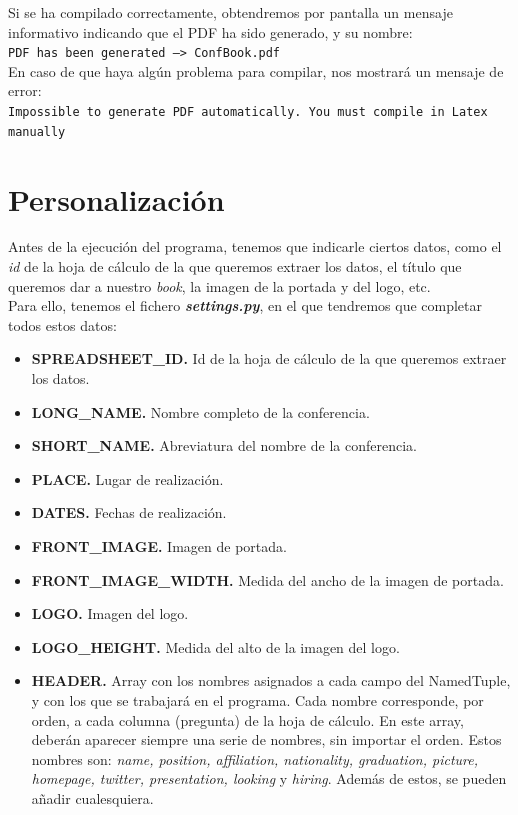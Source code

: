 \documentclass[a4paper, 12pt]{book}
\begin{document}
Si se ha compilado correctamente, obtendremos por pantalla un mensaje informativo indicando que el PDF ha sido generado, y su nombre:\\
\texttt{PDF has been generated --> ConfBook.pdf}\\

En caso de que haya algún problema para compilar, nos mostrará un mensaje de error:\\
\texttt{Impossible to generate PDF automatically. You must compile in Latex manually}


\section{Personalización}
Antes de la ejecución del programa, tenemos que indicarle ciertos datos, como el \textit{id} de la hoja de cálculo de la que queremos extraer los datos, el título que queremos dar a nuestro \textit{book}, la imagen de la portada y del logo, etc.\\

Para ello, tenemos el fichero \textbf{\textit{settings.py}}, en el que tendremos que completar todos estos datos:
\begin{itemize}
	\item \textbf{SPREADSHEET\_ID.} Id de la hoja de cálculo de la que queremos extraer los datos.
	\item \textbf{LONG\_NAME.} Nombre completo de la conferencia.
	\item \textbf{SHORT\_NAME.} Abreviatura del nombre de la conferencia.
	\item \textbf{PLACE.} Lugar de realización.
	\item \textbf{DATES.} Fechas de realización.
	\item \textbf{FRONT\_IMAGE.} Imagen de portada.
	\item \textbf{FRONT\_IMAGE\_WIDTH.} Medida del ancho de la imagen de portada.
	\item \textbf{LOGO.} Imagen del logo.
	\item \textbf{LOGO\_HEIGHT.} Medida del alto de la imagen del logo.
	\item \textbf{HEADER.} Array con los nombres asignados a cada campo del NamedTuple, y con los que se trabajará en el programa. Cada nombre corresponde, por orden, a cada columna (pregunta) de la hoja de cálculo. En este array, deberán aparecer siempre una serie de nombres, sin importar el orden. Estos nombres son: \textit{name, position, affiliation, nationality, graduation, picture, homepage, twitter, presentation, looking} y \textit{hiring}. Además de estos, se pueden añadir cualesquiera.
\end{itemize}
\end{document}
